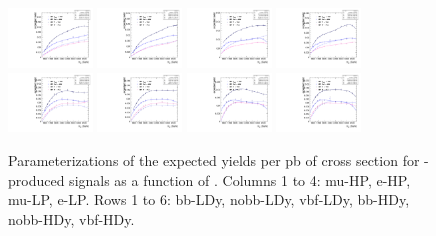 \begin{figure}[htbp]
  \includegraphics[width=0.2\textwidth]{fig/analysisAppendix/paramSignalYield_VBFSig_mu_HP_nobb_HDy.pdf}
  \includegraphics[width=0.2\textwidth]{fig/analysisAppendix/paramSignalYield_VBFSig_e_HP_nobb_HDy.pdf}
  \includegraphics[width=0.2\textwidth]{fig/analysisAppendix/paramSignalYield_VBFSig_mu_LP_nobb_HDy.pdf}
  \includegraphics[width=0.2\textwidth]{fig/analysisAppendix/paramSignalYield_VBFSig_e_LP_nobb_HDy.pdf}\\
  \includegraphics[width=0.2\textwidth]{fig/analysisAppendix/paramSignalYield_VBFSig_mu_HP_vbf_HDy.pdf}
  \includegraphics[width=0.2\textwidth]{fig/analysisAppendix/paramSignalYield_VBFSig_e_HP_vbf_HDy.pdf}
  \includegraphics[width=0.2\textwidth]{fig/analysisAppendix/paramSignalYield_VBFSig_mu_LP_vbf_HDy.pdf}
  \includegraphics[width=0.2\textwidth]{fig/analysisAppendix/paramSignalYield_VBFSig_e_LP_vbf_HDy.pdf}\\
  \caption{
    Parameterizations of the expected yields per pb of cross section for \VBF-produced signals as a function of \MX.
    Columns 1 to 4: mu-HP, e-HP, mu-LP, e-LP.
    Rows 1 to 6: bb-LDy, nobb-LDy, vbf-LDy, bb-HDy, nobb-HDy, vbf-HDy.
  }
  \label{fig:YieldParam_VBF_Run2}
\end{figure}

